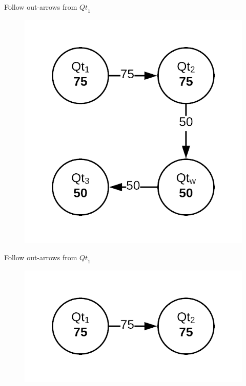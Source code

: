\documentclass[10pt]{beamer}
\begin{document}
\begin{frame}[fragile]{Follow out-arrows from $\mathit{Qt}_1$}
    \begin{figure}
        \center
        \includegraphics[scale=0.3]{apollo_session_aware_caching_3}
    \end{figure}
\end{frame}

\begin{frame}[fragile]{Follow out-arrows from $\mathit{Qt}_1$}
    \begin{figure}
        \center
        \includegraphics[scale=0.3]{apollo_session_aware_caching_4}
    \end{figure}
\end{frame}
\end{document}
